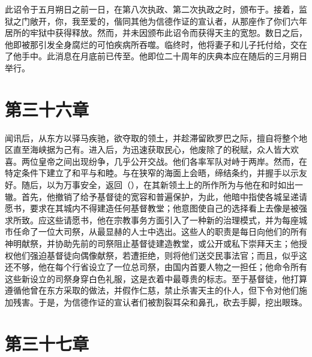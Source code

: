 此诏令于五月朔日之前一日，在第八次执政、第二次执政之时，颁布于。接着，监狱之门敞开，你，我至爱的，偕同其他为信德作证的宣认者，从那座作了你们六年居所的牢狱中获得释放。然而，并未因颁布此诏令而获得天主的宽恕。数日之后，他即被那引发全身腐烂的可怕疾病所吞噬。临终时，他将妻子和儿子托付给，交在了他手中。此消息在月底前已传至。他即位二十周年的庆典本应在随后的三月朔日举行。\par


\section{第三十六章}

闻讯后，从东方以驿马疾驰，欲夺取的领土，并趁滞留欧罗巴之际，擅自将整个地区直至海峡据为己有。进入后，为迅速获取民心，他废除了的税赋，众人皆大欢喜。两位皇帝之间出现纷争，几乎公开交战。他们各率军队对峙于两岸。然而，在特定条件下建立了和平与和睦。与在狭窄的海面上会晤，缔结条约，并握手以示友好。随后，以为万事安全，返回（），在其新领土上的所作所为与他在和时如出一辙。首先，他撤销了给予基督徒的宽容和普遍保护，为此，他暗中指使各城呈递请愿书，要求在其城内不得建造任何基督教堂；他意图使自己的选择看上去像是被强求所致。应这些请愿书，他在宗教事务方面引入了一种新的治理模式，并为每座城市任命了一位大司祭，从最显赫的人士中选出。这些人的职责是每日向他们的所有神明献祭，并协助先前的司祭阻止基督徒建造教堂，或公开或私下崇拜天主；他授权他们强迫基督徒向偶像献祭，若遭拒绝，则将他们送交民事法官；而且，似乎这还不够，他在每个行省设立了一位总司祭，由国内首要人物之一担任；他命令所有这些新设立的司祭身穿白色礼服，这是衣着中最尊贵的标志。至于基督徒，他打算遵循他曾在东方采取的做法，并假作仁慈，禁止杀害天主的仆人，但下令对他们施加残害。于是，为信德作证的宣认者们被割裂耳朵和鼻孔，砍去手脚，挖出眼珠。\par


\section{第三十七章}

